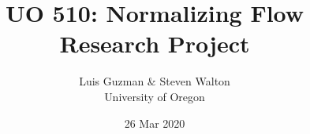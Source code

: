 \documentclass[pdf,11pt]{beamer}
\title{UO 510: Normalizing Flow Research Project
}
\author{Luis Guzman \& Steven Walton\\ \small University of Oregon}
\date{26 Mar 2020}
\begin{document}
\frame{\titlepage}


%
%
%
%
\end{document}
